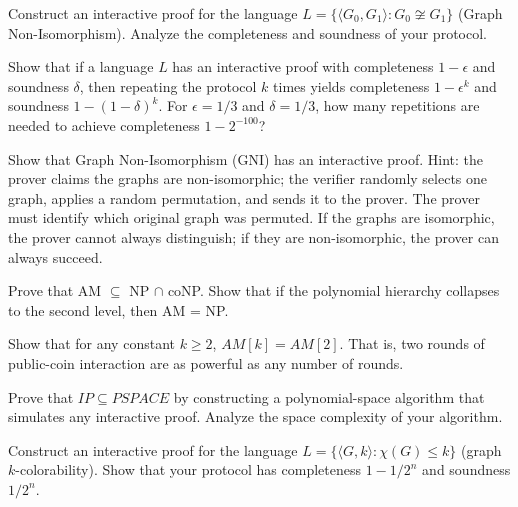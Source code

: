 \begin{exercise}[Basic]
Construct an interactive proof for the language $L = \{ \langle G_0, G_1 \rangle : G_0 \not\cong G_1 \}$ (Graph Non-Isomorphism). Analyze the completeness and soundness of your protocol.
\end{exercise}

\begin{exercise}[Basic]
Show that if a language $L$ has an interactive proof with completeness $1-\epsilon$ and soundness $\delta$, then repeating the protocol $k$ times yields completeness $1-\epsilon^k$ and soundness $1-(1-\delta)^k$. For $\epsilon = 1/3$ and $\delta = 1/3$, how many repetitions are needed to achieve completeness $1 - 2^{-100}$?
\end{exercise}

\begin{exercise}[Intermediate]
Show that Graph Non-Isomorphism (GNI) has an interactive proof. Hint: the prover claims the graphs are non-isomorphic; the verifier randomly selects one graph, applies a random permutation, and sends it to the prover. The prover must identify which original graph was permuted. If the graphs are isomorphic, the prover cannot always distinguish; if they are non-isomorphic, the prover can always succeed.
\end{exercise}

\begin{exercise}[Intermediate]
Prove that AM $\subseteq$ NP $\cap$ coNP. Show that if the polynomial hierarchy collapses to the second level, then AM = NP.
\end{exercise}

\begin{exercise}[Intermediate]
Show that for any constant $k \ge 2$, $AM[k] = AM[2]$. That is, two rounds of public-coin interaction are as powerful as any number of rounds.
\end{exercise}

\begin{exercise}[Intermediate]
Prove that $IP \subseteq PSPACE$ by constructing a polynomial-space algorithm that simulates any interactive proof. Analyze the space complexity of your algorithm.
\end{exercise}

\begin{exercise}[Intermediate]
Construct an interactive proof for the language $L = \{ \langle G, k \rangle : \chi(G) \le k \}$ (graph $k$-colorability). Show that your protocol has completeness $1 - 1/2^n$ and soundness $1/2^n$.
\end{exercise}

